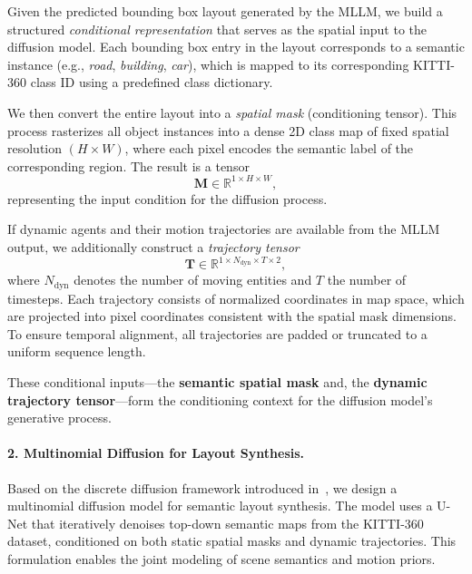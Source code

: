 \documentclass{article}
\begin{document}
Given the predicted bounding box layout generated by the MLLM, we build a structured \textit{conditional representation} that serves as the spatial input to the diffusion model. Each bounding box entry in the layout corresponds to a semantic instance (e.g., \textit{road}, \textit{building}, \textit{car}), which is mapped to its corresponding KITTI-360 class ID using a predefined class dictionary.

We then convert the entire layout into a \textit{spatial mask} (conditioning tensor). This process rasterizes all object instances into a dense 2D class map of fixed spatial resolution $(H \times W)$, where each pixel encodes the semantic label of the corresponding region. The result is a tensor 
\[
\mathbf{M} \in \mathbb{R}^{1 \times H \times W},
\]
representing the input condition for the diffusion process.

If dynamic agents and their motion trajectories are available from the MLLM output, we additionally construct a \textit{trajectory tensor} 
\[
\mathbf{T} \in \mathbb{R}^{1 \times N_{\text{dyn}} \times T \times 2},
\]
where $N_{\text{dyn}}$ denotes the number of moving entities and $T$ the number of timesteps. Each trajectory consists of normalized coordinates in map space, which are projected into pixel coordinates consistent with the spatial mask dimensions. To ensure temporal alignment, all trajectories are padded or truncated to a uniform sequence length.

These conditional inputs—the \textbf{semantic spatial mask} and, the \textbf{dynamic trajectory tensor}—form the conditioning context for the diffusion model’s generative process.


\paragraph{2. Multinomial Diffusion for Layout Synthesis.}

Based on the discrete diffusion framework introduced in~\cite{hoogeboom2021argmax}, we design a multinomial diffusion model for semantic layout synthesis. The model uses a U-Net that iteratively denoises top-down semantic maps from the KITTI-360 dataset, conditioned on both static spatial masks and dynamic trajectories. This formulation enables the joint modeling of scene semantics and motion priors.
\end{document}
